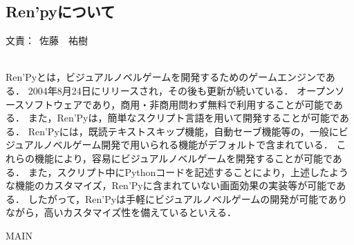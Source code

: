 \documentclass[a4paper]{jarticle}
\newcommand{\resp}[1]{\begin{flushright}文責：~#1\end{flushright}~\\}
\begin{document}
\fi

\subsection{Ren'pyについて}
  \resp{佐藤　祐樹}

  Ren'Pyとは，ビジュアルノベルゲームを開発するためのゲームエンジンである．
2004年8月24日にリリースされ，その後も更新が続いている．
オープンソースソフトウェアであり，商用・非商用問わず無料で利用することが可能である．
また，Ren'Pyは，簡単なスクリプト言語を用いて開発することが可能である．
Ren'Pyには，既読テキストスキップ機能，自動セーブ機能等の，一般にビジュアルノベルゲーム開発で用いられる機能がデフォルトで含まれている．
これらの機能により，容易にビジュアルノベルゲームを開発することが可能である．
また，スクリプト中にPythonコードを記述することにより，上述したような機能のカスタマイズ，Ren'Pyに含まれていない画面効果の実装等が可能である．
したがって，Ren'Pyは手軽にビジュアルノベルゲームの開発が可能でありながら，高いカスタマイズ性を備えているといえる．

\expandafter\ifx\csname MAIN \endcsname\relax
  
\end{document}
